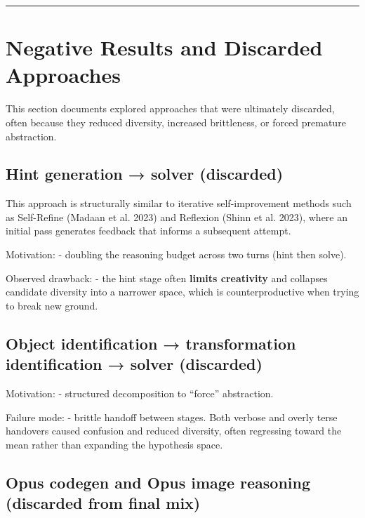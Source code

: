 \documentclass[11pt]{article}
\begin{document}
\begin{center}\rule{0.5\linewidth}{0.5pt}\end{center}

\hypertarget{negative-results-and-discarded-approaches}{%
\section{Negative Results and Discarded
Approaches}\label{negative-results-and-discarded-approaches}}

This section documents explored approaches that were ultimately
discarded, often because they reduced diversity, increased brittleness,
or forced premature abstraction.

\hypertarget{hint-generation-solver-discarded}{%
\subsection{Hint generation → solver
(discarded)}\label{hint-generation-solver-discarded}}

This approach is structurally similar to iterative self-improvement
methods such as Self-Refine (Madaan et al. 2023) and Reflexion (Shinn et
al. 2023), where an initial pass generates feedback that informs a
subsequent attempt.

Motivation: - doubling the reasoning budget across two turns (hint then
solve).

Observed drawback: - the hint stage often \textbf{limits creativity} and
collapses candidate diversity into a narrower space, which is
counterproductive when trying to break new ground.

\hypertarget{object-identification-transformation-identification-solver-discarded}{%
\subsection{Object identification → transformation identification →
solver
(discarded)}\label{object-identification-transformation-identification-solver-discarded}}

Motivation: - structured decomposition to ``force'' abstraction.

Failure mode: - brittle handoff between stages. Both verbose and overly
terse handovers caused confusion and reduced diversity, often regressing
toward the mean rather than expanding the hypothesis space.

\hypertarget{opus-codegen-and-opus-image-reasoning-discarded-from-final-mix}{%
\subsection{Opus codegen and Opus image reasoning (discarded from final
mix)}\label{opus-codegen-and-opus-image-reasoning-discarded-from-final-mix}}
\end{document}
